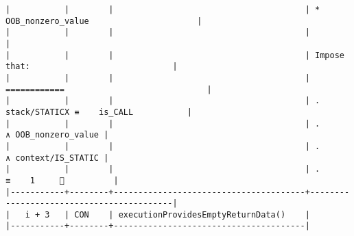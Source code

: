 \documentclass[varwidth=\maxdimen,margin=0.5cm,multi={verbatim}]{standalone}
\begin{document}
\begin{verbatim}
|           |        |                                       | * OOB_nonzero_value                      |
|           |        |                                       |                                          |
|           |        |                                       | Impose that:                             |
|           |        |                                       | ============                             |
|           |        |                                       | .   stack/STATICX ≡    is_CALL           |
|           |        |                                       | .                    ∧ OOB_nonzero_value |
|           |        |                                       | .                    ∧ context/IS_STATIC |
|           |        |                                       | .                 ≡    1     👋          |
|-----------+--------+---------------------------------------+------------------------------------------|
|   i + 3   | CON    | executionProvidesEmptyReturnData()    |
|-----------+--------+---------------------------------------|

\end{verbatim}
\end{document}
